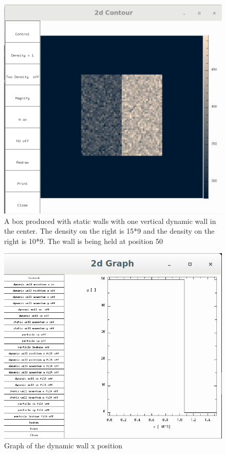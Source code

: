 \documentclass{article}
\begin{document}
\begin{figure}[H]
\includegraphics[scale=0.35]{A1p1.png}
\caption{\label{fig}  A box produced with static walls with one vertical dynamic wall in the center. The density on the right is 15*9 and the density on the right is 10*9. The wall is being held at position 50}
\end{figure}

\begin{figure}[H]
\includegraphics[scale=0.35]{A1p2.png}
\caption{\label{fig} Graph of the dynamic wall x position}
\end{figure}
\end{document}
